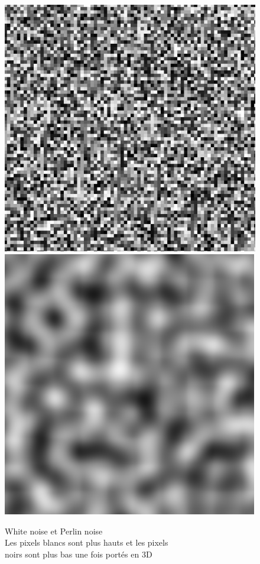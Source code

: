 \documentclass{EPUProjetDi}
\begin{document}
\begin{figure}[ht]
	\centering
	\includegraphics[scale=.49]{white_noise}
	\includegraphics[scale=.49]{perlin_noise}
	\caption[White noise et Perlin noise]{White noise et Perlin noise\\Les pixels blancs sont plus hauts et les pixels\\ noirs sont plus bas une fois portés en 3D}
	\label{fig:noises}
\end{figure}
\end{document}
